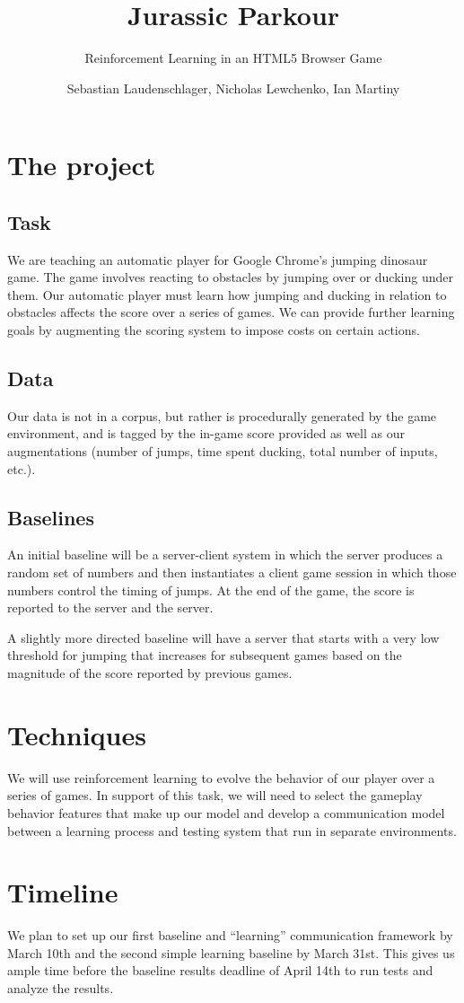 \documentclass{scrartcl}
\title{Jurassic Parkour}
\subtitle{Reinforcement Learning in an HTML5 Browser Game}
\author{Sebastian Laudenschlager, Nicholas Lewchenko, Ian Martiny}
\begin{document}
\maketitle

\section{The project}

\subsection{Task}
We are teaching an automatic player for Google Chrome's jumping
dinosaur game.  The game involves reacting to obstacles by jumping
over or ducking under them.  Our automatic player must learn how
jumping and ducking in relation to obstacles affects the score over a
series of games.  We can provide further learning goals by augmenting
the scoring system to impose costs on certain actions.

\subsection{Data}
Our data is not in a corpus, but rather is procedurally generated by
the game environment, and is tagged by the in-game score provided as
well as our augmentations (number of jumps, time spent ducking, total
number of inputs, etc.).

\subsection{Baselines}
An initial baseline will be a server-client system in which the server
produces a random set of numbers and then instantiates a client game
session in which those numbers control the timing of jumps.  At the
end of the game, the score is reported to the server and the server.

A slightly more directed baseline will have a server that starts with
a very low threshold for jumping that increases for subsequent games
based on the magnitude of the score reported by previous games.

\section{Techniques}
We will use reinforcement learning to evolve the behavior of our
player over a series of games.  In support of this task, we will
need to select the gameplay behavior features that make up our model
and develop a communication model between a learning process and
testing system that run in separate environments.

\section{Timeline}
We plan to set up our first baseline and ``learning'' communication
framework by March 10th and the second simple learning baseline by
March 31st.  This gives us ample time before the baseline results
deadline of April 14th to run tests and analyze the results.
\end{document}
